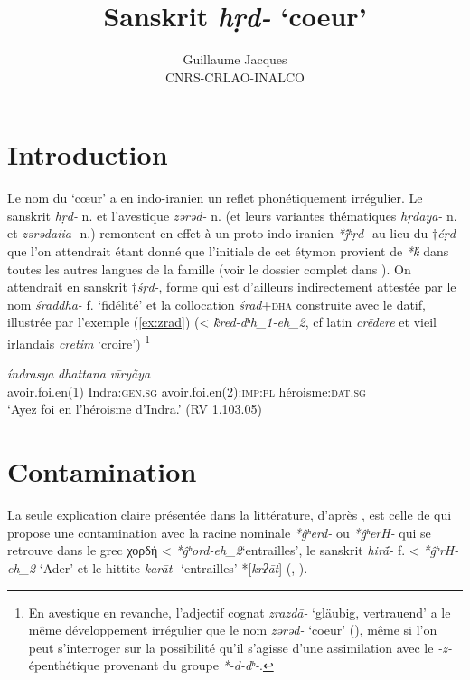 \documentclass{article}
\newcommand{\ipa}[1]{{\phon\textit{#1}}}
\newcommand{\grec}[1]{{\mleccha #1}}
\begin{document}
 
\title{Sanskrit \ipa{hṛd-} `coeur'}
\author{Guillaume Jacques\\ CNRS-CRLAO-INALCO}
\maketitle
\section*{Introduction}
Le nom du `cœur' a en indo-iranien un reflet phonétiquement irrégulier. Le sanskrit \ipa{hṛd-} n. et l'avestique \ipa{zərəd-} n. (et leurs variantes thématiques \ipa{hṛdaya-} n. et \ipa{zərədaiia-} n.) remontent en effet à un proto-indo-iranien \ipa{*j́ʰṛd-} au lieu du $\dagger$\ipa{ćṛd-} que l'on attendrait étant donné que l'initiale de cet étymon provient de \ipa{*ḱ} dans toutes les autres langues de la famille (voir le dossier complet dans \citealt[417-423]{wodtko08NIL}). On attendrait en sanskrit $\dagger$\ipa{śṛd-}, forme qui est d'ailleurs  indirectement attestée par le nom \ipa{śraddhā-} f. `fidélité' et la collocation \ipa{śrad}+\textsc{dha} construite avec le datif, illustrée par l'exemple (\ref{ex:zrad}) (< \ipa{k̂red-dʰh_1-eh_2}, cf latin \ipa{crēdere} et vieil irlandais \ipa{cretim} `croire') \footnote{En avestique en revanche, l'adjectif cognat \ipa{zrazdā-} `gläubig, vertrauend' a le même développement irrégulier que le nom \ipa{zərəd-} `coeur' (\citealt[663]{mayrhofer92ewa}), même si l'on peut s'interroger sur la possibilité qu'il s'agisse d'une assimilation avec le \ipa{-z-} épenthétique provenant du groupe \ipa{*-d-dʰ-}. }

\begin{exe}
\ex \label{ex:zrad}
\gll \ipa{śrád} \ipa{índrasya} \ipa{dhattana} \ipa{vīryā̀ya}\\
avoir.foi.en(1) Indra:\textsc{gen.sg} avoir.foi.en(2):\textsc{imp:pl} héroisme:\textsc{dat.sg}\\
\glt `Ayez foi en l'héroisme d'Indra.' (RV 1.103.05)
\end{exe}
 
 \section{Contamination}
La seule explication claire présentée dans la littérature, d'après \citet[420]{wodtko08NIL}, est celle de \citet{szemerenyi70heart} qui propose une contamination avec la racine nominale \ipa{*ĝʰerd-} ou \ipa{*ĝʰerH-} qui se retrouve dans le grec \grec{χορδή} < \ipa{*ĝʰord-eh_2}`entrailles', le sanskrit \ipa{hirā́-} f. < \ipa{*ĝʰrH-eh_2} `Ader' et le hittite \ipa{karāt-} `entrailles' *[\ipa{krʔāt}] (\citealt[208]{schrijver91laryngeals}, \citealt[446]{kloekhorst08edhil}).
\end{document}

